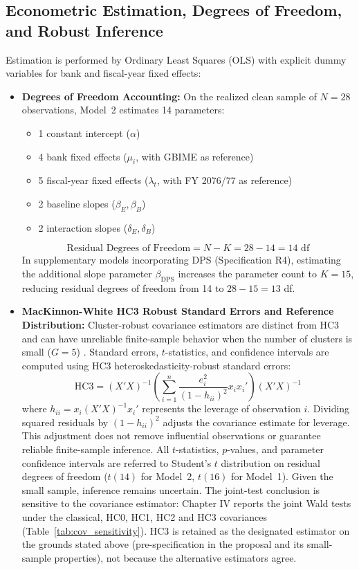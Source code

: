 \subsection{Econometric Estimation, Degrees of Freedom, and Robust Inference}
Estimation is performed by Ordinary Least Squares (OLS) with explicit dummy variables for bank and fiscal-year fixed effects:
\begin{itemize}
    \item \textbf{Degrees of Freedom Accounting:} On the realized clean sample of $N = 28$ observations, Model~2 estimates 14 parameters:
    \begin{itemize}
        \item 1 constant intercept ($\alpha$)
        \item 4 bank fixed effects ($\mu_i$, with GBIME as reference)
        \item 5 fiscal-year fixed effects ($\lambda_t$, with FY 2076/77 as reference)
        \item 2 baseline slopes ($\beta_E, \beta_B$)
        \item 2 interaction slopes ($\delta_E, \delta_B$)
    \end{itemize}
    \begin{equation}
    \text{Residual Degrees of Freedom} = N - K = 28 - 14 = 14 \text{ df}
    \end{equation}
    In supplementary models incorporating DPS (Specification R4), estimating the additional slope parameter $\beta_{\text{DPS}}$ increases the parameter count to $K = 15$, reducing residual degrees of freedom from 14 to $28 - 15 = 13$ df.
    \item \textbf{MacKinnon-White HC3 Robust Standard Errors and Reference Distribution:} Cluster-robust covariance estimators are distinct from HC3 and can have unreliable finite-sample behavior when the number of clusters is small ($G = 5$) \citep{cameron2008clusters}. Standard errors, $t$-statistics, and confidence intervals are computed using \citet{mackinnon1985} HC3 heteroskedasticity-robust standard errors:
    \begin{equation}
    \text{HC3} = (X'X)^{-1} \left( \sum_{i=1}^n \frac{e_i^2}{(1 - h_{ii})^2} x_i x_i' \right) (X'X)^{-1}
    \label{eq:hc3}
    \end{equation}
    where $h_{ii} = x_i (X'X)^{-1} x_i'$ represents the leverage of observation $i$. Dividing squared residuals by $(1 - h_{ii})^2$ adjusts the covariance estimate for leverage. This adjustment does not remove influential observations or guarantee reliable finite-sample inference. All $t$-statistics, $p$-values, and parameter confidence intervals are referred to Student's $t$ distribution on residual degrees of freedom ($t(14)$ for Model~2, $t(16)$ for Model~1). Given the small sample, inference remains uncertain. The joint-test conclusion is sensitive to the covariance estimator: Chapter IV reports the joint Wald tests under the classical, HC0, HC1, HC2 and HC3 covariances (Table~\ref{tab:cov_sensitivity}). HC3 is retained as the designated estimator on the grounds stated above (pre-specification in the proposal and its small-sample properties), not because the alternative estimators agree.

\end{itemize}
